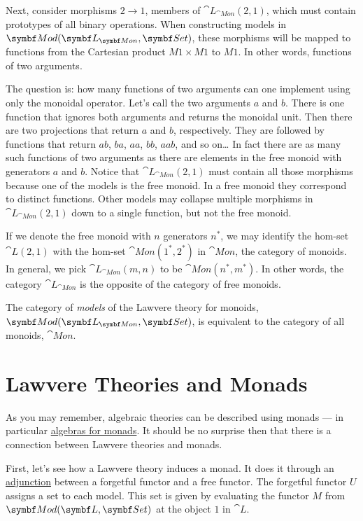 Next, consider morphisms $2 \to 1$, members of
$\cat{L}_{\cat{Mon}}(2, 1)$, which must contain prototypes of all binary
operations. When constructing models in $\cat{Mod}(\cat{L}_{\cat{Mon}}, \Set)$, these
morphisms will be mapped to functions from the Cartesian product
$M 1 \times M 1$ to $M 1$. In other words, functions of
two arguments.

The question is: how many functions of two arguments can one implement
using only the monoidal operator. Let's call the two arguments
$a$ and $b$. There is one function that ignores both
arguments and returns the monoidal unit. Then there are two projections
that return $a$ and $b$, respectively. They are followed
by functions that return $ab$, $ba$, $aa$,
$bb$, $aab$, and so on\ldots{} In fact there are as many
such functions of two arguments as there are elements in the free monoid
with generators $a$ and $b$. Notice that
$\cat{L}_{\cat{Mon}}(2, 1)$ must contain all those morphisms because one of the
models is the free monoid. In a free monoid they correspond to distinct
functions. Other models may collapse multiple morphisms in
$\cat{L}_{\cat{Mon}}(2, 1)$ down to a single function, but not the free monoid.

If we denote the free monoid with $n$ generators $n^*$, we may
identify the hom-set $\cat{L}(2, 1)$ with the hom-set
$\cat{Mon}(1^*, 2^*)$ in $\cat{Mon}$, the category of monoids. In
general, we pick $\cat{L}_{\cat{Mon}}(m, n)$ to be $\cat{Mon}(n^*, m^*)$. In
other words, the category $\cat{L}_{\cat{Mon}}$ is the opposite of the category
of free monoids.

The category of \emph{models} of the Lawvere theory for monoids,\\
$\cat{Mod}(\cat{L}_{\cat{Mon}}, \Set)$, is equivalent to the category of all monoids,
$\cat{Mon}$.

\section{Lawvere Theories and Monads}

As you may remember, algebraic theories can be described using monads
--- in particular
\hyperref[algebras-for-monads]{algebras
  for monads}. It should be no surprise then that there is a connection
between Lawvere theories and monads.

First, let's see how a Lawvere theory induces a monad. It does it
through an
\hyperref[free-forgetful-adjunctions]{adjunction}
between a forgetful functor and a free functor. The forgetful functor
$U$ assigns a set to each model. This set is given by evaluating
the functor $M$ from $\cat{Mod}(\cat{L}, \Set)$ at the object $1$ in
$\cat{L}$.

